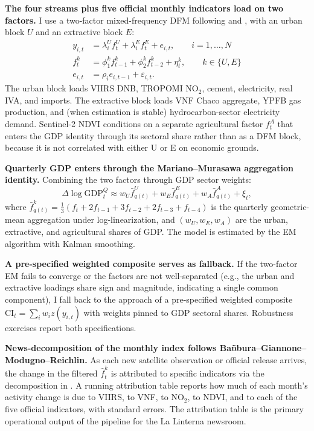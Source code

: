 \documentclass[11pt,letterpaper]{article}
\newcommand{\claim}[1]{\textbf{#1.}}
\begin{document}
\claim{The four streams plus five official monthly indicators load on two factors} I use a two-factor mixed-frequency DFM following \citet{mariano_murasawa2003} and \citet{grs2008}, with an urban block $U$ and an extractive block $E$:
\begin{align}
y_{i,t} &= \lambda_i^U f_t^U + \lambda_i^E f_t^E + e_{i,t}, \qquad i = 1, \ldots, N \label{eq:dfm_obs}\\
f_t^k &= \phi_1^k f_{t-1}^k + \phi_2^k f_{t-2}^k + \eta_t^k, \qquad k \in \{U, E\} \label{eq:dfm_state}\\
e_{i,t} &= \rho_i e_{i,t-1} + \varepsilon_{i,t}. \label{eq:dfm_idio}
\end{align}
The urban block loads VIIRS DNB, TROPOMI NO$_2$, cement, electricity, real IVA, and imports. The extractive block loads VNF Chaco aggregate, YPFB gas production, and (when estimation is stable) hydrocarbon-sector electricity demand. Sentinel-2 NDVI conditions on a separate agricultural factor $f_t^A$ that enters the GDP identity through its sectoral share rather than as a DFM block, because it is not correlated with either U or E on economic grounds.

\claim{Quarterly GDP enters through the Mariano--Murasawa aggregation identity} Combining the two factors through GDP sector weights:
\begin{equation}
\Delta \log \text{GDP}^Q_t \approx w_U \bar f^U_{q(t)} + w_E \bar f^E_{q(t)} + w_A \bar f^A_{q(t)} + \xi_t,
\label{eq:mm_aggregation}
\end{equation}
where $\bar f^k_{q(t)} = \tfrac{1}{3}(f_t + 2 f_{t-1} + 3 f_{t-2} + 2 f_{t-3} + f_{t-4})$ is the quarterly geometric-mean aggregation under log-linearization, and $(w_U, w_E, w_A)$ are the urban, extractive, and agricultural shares of GDP. The model is estimated by the EM algorithm with Kalman smoothing.

\claim{A pre-specified weighted composite serves as fallback} If the two-factor EM fails to converge or the factors are not well-separated (e.g., the urban and extractive loadings share sign and magnitude, indicating a single common component), I fall back to the \citet{lmst2022} approach of a pre-specified weighted composite $\text{CI}_t = \sum_i w_i z(y_{i,t})$ with weights pinned to GDP sectoral shares. Robustness exercises report both specifications.

\claim{News-decomposition of the monthly index follows Ba\~nbura--Giannone--Modugno--Reichlin} As each new satellite observation or official release arrives, the change in the filtered $\hat{f}_t^k$ is attributed to specific indicators via the decomposition in \citet{bgmr2013}. A running attribution table reports how much of each month's activity change is due to VIIRS, to VNF, to NO$_2$, to NDVI, and to each of the five official indicators, with standard errors. The attribution table is the primary operational output of the pipeline for the La Linterna newsroom.
\end{document}
